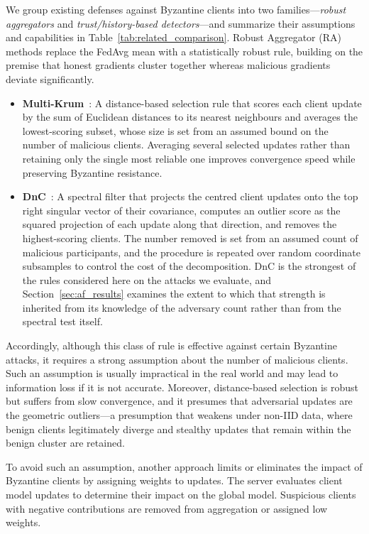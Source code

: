 \documentclass[journal]{IEEEtran}
\begin{document}
We group existing defenses against Byzantine clients into two families---\emph{robust aggregators} and \emph{trust/history-based detectors}---and summarize their assumptions and capabilities in Table~\ref{tab:related_comparison}. Robust Aggregator (RA) methods replace the FedAvg mean with a statistically robust rule, building on the premise that honest gradients cluster together whereas malicious gradients deviate significantly.

\begin{itemize}
    \item \textbf{Multi-Krum}~\cite{blanchard2017machine}: A distance-based selection rule that scores each client update by the sum of Euclidean distances to its nearest neighbours and averages the lowest-scoring subset, whose size is set from an assumed bound on the number of malicious clients. Averaging several selected updates rather than retaining only the single most reliable one improves convergence speed while preserving Byzantine resistance.

    \item \textbf{DnC}~\cite{shejwalkar2021manipulating}: A spectral filter that projects the centred client updates onto the top right singular vector of their covariance, computes an outlier score as the squared projection of each update along that direction, and removes the highest-scoring clients. The number removed is set from an assumed count of malicious participants, and the procedure is repeated over random coordinate subsamples to control the cost of the decomposition. DnC is the strongest of the rules considered here on the attacks we evaluate, and Section~\ref{sec:af_results} examines the extent to which that strength is inherited from its knowledge of the adversary count rather than from the spectral test itself.
\end{itemize}

Accordingly, although this class of rule is effective against certain Byzantine attacks, it requires a strong assumption about the number of malicious clients. Such an assumption is usually impractical in the real world and may lead to information loss if it is not accurate. Moreover, distance-based selection is robust but suffers from slow convergence, and it presumes that adversarial updates are the geometric outliers---a presumption that weakens under non-IID data, where benign clients legitimately diverge and stealthy updates that remain within the benign cluster are retained.

To avoid such an assumption, another approach limits or eliminates the impact of Byzantine clients by assigning weights to updates. The server evaluates client model updates to determine their impact on the global model. Suspicious clients with negative contributions are removed from aggregation or assigned low weights.
\end{document}
